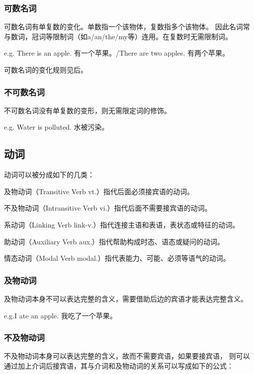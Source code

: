 \documentclass[UTF8]{ctexbook}
\begin{document}
\subsubsection{可数名词}

可数名词有单复数的变化。单数指一个该物体，复数指多个该物体。
因此名词常与数词，冠词等限制词（如a/an/the/my等）连用。在复数时无需限制词。

e.g. There is an apple. 有一个苹果。/There are two apples. 有两个苹果。

可数名词的变化规则见后。

\subsubsection{不可数名词}

不可数名词没有单复数的变形，则无需限定词的修饰。

e.g. Water is polluted. 水被污染。

\subsection{动词}

动词可以被分成如下的几类：

及物动词（Transitive Verb vt.）指代后面必须接宾语的动词。

不及物动词（Intransitive Verb vi.）指代后面不需要接宾语的动词。

系动词（Linking Verb link-v.）指代连接主语和表语，表状态或特征的动词。

助动词（Auxiliary Verb aux.）指代帮助构成时态、语态或疑问的动词。

情态动词（Modal Verb modal.）指代表能力、可能、必须等语气的动词。

\subsubsection{及物动词}

及物动词本身不可以表达完整的含义，需要借助后边的宾语才能表达完整含义。

e.g.I ate an apple. 我吃了一个苹果。

\subsubsection{不及物动词}

不及物动词本身可以表达完整的含义，故而不需要宾语，如果要接宾语，
则可以通过加上介词后接宾语，其与介词和及物动词的关系可以写成如下的公式：
\end{document}
